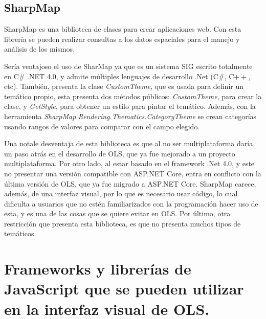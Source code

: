 \subsection{SharpMap}
SharpMap es una biblioteca de clases para crear aplicaciones web. Con esta librer\'ia se pueden realizar consultas a los datos espaciales para el manejo y an\'alisis de los mismos.

Ser\'ia ventajoso el uso de SharMap ya que es un sistema SIG escrito totalmente en C\# .NET 4.0, y admite m\'ultiples lenguajes de desarrollo .Net (C\#, C$++$, etc). Tambi\'en, presenta la clase \textit{CustomTheme}, que es usada para definir un tem\'atico propio, esta presenta dos m\'etodos p\'ublicos: \textit{CustomTheme}, para crear la clase, y \textit{GetStyle}, para obtener un estilo para pintar el tem\'atico. Adem\'as, con la herramienta \textit{SharpMap.Rendering.Thematics.CategoryTheme} se crean categor\'ias usando rangos de valores para comparar con el campo elegido. 

Una notale desventaja de esta biblioteca es que al no ser multiplataforma dar\'ia un paso atr\'as en el desarrollo de OLS, que ya
fue mejorado a un proyecto multiplataforma. Por otro lado, al estar basado en el framework .Net 4.0, y este no presentar una versi\'on compatible con ASP.NET Core, entra en conflicto con la \'ultima versi\'on de OLS, que ya fue migrado a ASP.NET Core. SharpMap carece, adem\'as, de una interfaz visual, por lo que es necesario usar c\'odigo, lo cual dificulta a usuarios que no est\'en familiarizados con la programaci\'on hacer uso de esta, y es una de las cosas que se quiere evitar en OLS. Por \'ultimo, otra restricci\'on que presenta esta biblioteca, es que no presenta muchos tipos de tem\'aticos.


\section{Frameworks y librer\'ias de JavaScript que se pueden utilizar en la interfaz visual de OLS.}

